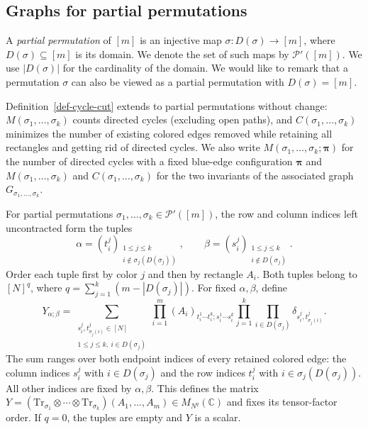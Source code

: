 \documentclass[12pt]{article}
\numberwithin{equation}{section}
\theoremstyle{plain}
\def\bC{\mathbb C}
\def\cP{\mathcal P}
\def\Tr{\mathrm {Tr}}
\begin{document}
\subsection{Graphs for partial permutations} \label{sec:graph-partial}

A \emph{partial permutation} of $[m]$ is an injective map $\sigma:D(\sigma)\to[m]$, where $D(\sigma)\subseteq[m]$ is its domain. We denote the set of such maps by $\cP'([m])$. We use $|D(\sigma)|$ for the cardinality of the domain. We would like to remark that a permutation $\sigma$ can also be viewed as a partial permutation with $D(\sigma) = [m]$.

Definition~\ref{def-cycle-cut} extends to partial permutations without change: $M(\sigma_1,\ldots,\sigma_k)$ counts directed cycles (excluding open paths), and $C(\sigma_1,\ldots,\sigma_k)$ minimizes the number of existing colored edges removed while retaining all rectangles and getting rid of directed cycles. We also write $M(\sigma_1,\ldots,\sigma_k;\boldsymbol\pi)$ for the number of directed cycles with a fixed blue-edge configuration $\boldsymbol \pi$ and $M(\sigma_1,\ldots,\sigma_k)$ and $C(\sigma_1,\ldots,\sigma_k)$ for the two invariants of the associated graph $G_{\sigma_1,\ldots,\sigma_k}$.

For partial permutations $\sigma_1,\ldots,\sigma_k \in \cP'([m])$, the row and column indices left uncontracted form the tuples
\[
\alpha=(t_i^j)_{\substack{1\le j\le k\\i\notin\sigma_j(D(\sigma_j))}},
\qquad
\beta=(s_i^j)_{\substack{1\le j\le k\\i\notin D(\sigma_j)}}.
\]
Order each tuple first by color $j$ and then by rectangle $A_i$. Both tuples belong to $[N]^q$, where $q=\sum_{j=1}^k(m-|D(\sigma_j)|)$. For fixed $\alpha,\beta$, define
\begin{equation}\label{eq-coordinate-partial}
Y_{\alpha;\beta}
=\sum_{\substack{s_i^j,t_{\sigma_j(i)}^j\in[N]\\1\le j\le k,\ i\in D(\sigma_j)}}
\prod_{i=1}^m (A_i)_{t_i^1\cdots t_i^k;s_i^1\cdots s_i^k}
\prod_{j=1}^k\prod_{i\in D(\sigma_j)}\delta_{s_i^j,t_{\sigma_j(i)}^j}.
\end{equation}
The sum ranges over both endpoint indices of every retained colored edge: the column indices $s_i^j$ with $i\in D(\sigma_j)$ and the row indices $t_i^j$ with $i\in\sigma_j(D(\sigma_j))$. All other indices are fixed by $\alpha,\beta$. This defines the matrix $Y=(\Tr_{\sigma_1}\otimes\cdots\otimes\Tr_{\sigma_k})(A_1,\ldots,A_m)\in M_{N^q}(\bC)$ and fixes its tensor-factor order. If $q=0$, the tuples are empty and $Y$ is a scalar.
\end{document}
